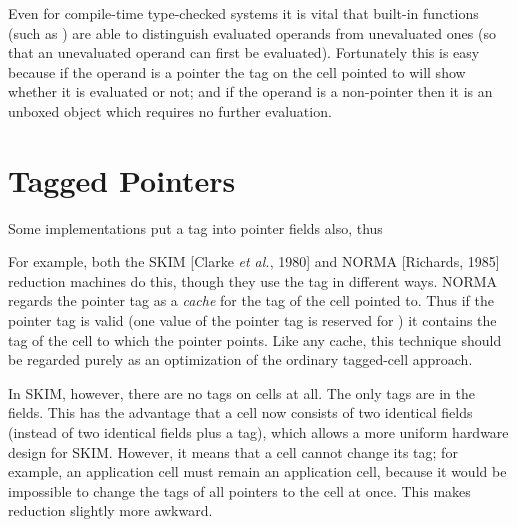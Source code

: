 Even for compile-time type-checked systems it is vital that built-in
functions (such as \ml{+}) are able to distinguish evaluated operands from
unevaluated ones (so that an unevaluated operand can first be evaluated).
Fortunately this is easy because if the operand is a pointer the tag on the cell
pointed to will show whether it is evaluated or not; and if the operand is a
non-pointer then it is an unboxed object which requires no further evaluation.

\section{Tagged Pointers}

Some implementations put a tag into pointer fields also, thus

\begin{center}
    {%
        \sffamily \footnotesize
    }%
\end{center}
For example, both the SKIM [Clarke \textit{et al.}, 1980] and NORMA [Richards,
1985] reduction machines do this, though they use the tag in different ways.
NORMA regards the pointer tag as a \textit{cache} for the tag of the cell pointed to.
Thus if the pointer tag is valid (one value of the pointer tag is reserved for
) it contains the tag of the cell to which the pointer points. Like any
cache, this technique should be regarded purely as an optimization of the
ordinary tagged-cell approach.

In SKIM, however, there are no tags on cells at all. The only tags are in the
fields. This has the advantage that a cell now consists of two identical fields
(instead of two identical fields plus a tag), which allows a more uniform
hardware design for SKIM. However, it means that a cell cannot change its
tag; for example, an application cell must remain an application cell, because
it would be impossible to change the tags of all pointers to the cell at once.
This makes reduction slightly more awkward.

